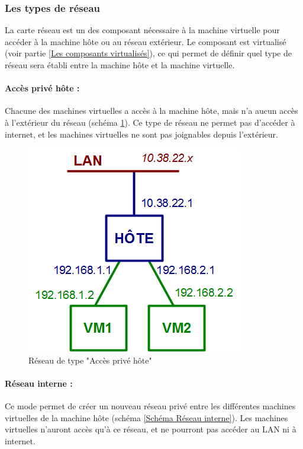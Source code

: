 \subsubsection{Les types de réseau}
\label{Les types de réseau}

La carte réseau est un des composant nécessaire à la machine virtuelle pour accéder à la machine hôte ou au réseau extérieur.
Le composant est virtualisé (voir partie \ref{Les composants virtualisés}), ce qui permet de définir quel type de réseau sera établi entre la machine hôte et la machine virtuelle.
\\


\paragraph{Accès privé hôte :}

Chacune des machines virtuelles a accès à la machine hôte, mais n'a aucun accès à l'extérieur du réseau (schéma \ref{Schéma Accès privé hôte}).
Ce type de réseau ne permet pas d'accéder à internet, et les machines virtuelles ne sont pas joignables depuis l'extérieur.

\begin{figure}[H]
	\center
	\includegraphics[scale=0.5]{img/types_reseau/Acces_prive_hote.png}
	\caption{Réseau de type "Accès privé hôte"}
	\label{Schéma Accès privé hôte}
\end{figure}


\paragraph{Réseau interne :}

Ce mode permet de créer un nouveau réseau privé entre les différentes machines virtuelles de la machine hôte (schéma \ref{Schéma Réseau interne}).
Les machines virtuelles n'auront accès qu'à ce réseau, et ne pourront pas accéder au LAN ni à internet.

